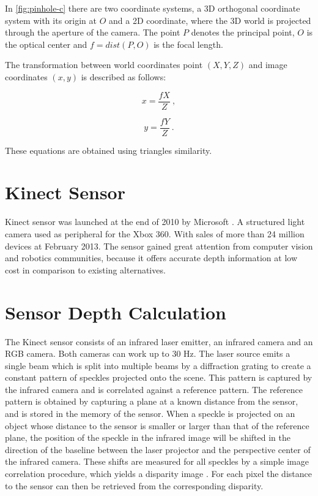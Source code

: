 In \ref{fig:pinhole-c} there are two coordinate systems, a 3D orthogonal coordinate system with its origin at $O$ and a 2D coordinate, where the 3D world is projected through the aperture of the camera. The point $P$ denotes the principal point, $O$ is the optical center and 
$f=dist(P,O)$ is the focal length.

The transformation between world coordinates point $(X,Y,Z)$ and image coordinates $(x,y)$ is described as 
follows:

\begin{equation}
\label{eq:disparity2}
 x = \frac{fX}{Z}\ ,
\end{equation}

\begin{equation}
\label{eq:disparity2}
 y = \frac{fY}{Z}\ .
\end{equation}

These equations are  obtained using triangles similarity.

\section{Kinect Sensor}

Kinect sensor was launched at the end of 2010 by Microsoft \cite{KinectWeb}. A structured light camera 
used as peripheral for the Xbox 360. With sales of more than 24 million devices at February 2013.
The sensor gained great attention from computer vision and robotics communities, because it offers 
accurate depth information at low cost in comparison to existing alternatives.

\section{Sensor Depth Calculation}

The Kinect sensor consists of an infrared laser emitter, an 
infrared camera and an RGB camera. Both cameras can work up to 30 Hz. 
The laser source emits a single 
beam which is split into multiple beams by a diffraction 
grating to create a constant 
pattern of speckles projected onto the scene. This pattern is 
captured by the infrared camera and is correlated against a 
reference pattern. The reference pattern is obtained by capturing 
a plane at a known distance from the sensor, and is stored in the 
memory of the sensor. When a speckle is projected on an object 
whose distance to the sensor is smaller or larger than that of the 
reference plane, the position of the speckle in the infrared image 
will be shifted in the direction of the baseline between the laser 
projector and the perspective center of the infrared camera. 
These shifts are measured for all speckles by a simple image 
correlation procedure, which yields a disparity image \cite{khoshelham2011accuracy}. For each 
pixel the distance to the sensor can then be retrieved from the 
corresponding disparity.



